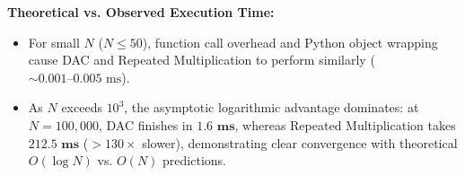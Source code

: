 \documentclass[12pt]{article}
\begin{document}
\textbf{Theoretical vs. Observed Execution Time:}
\begin{itemize}
    \item For small $N$ ($N \le 50$), function call overhead and Python object wrapping cause DAC and Repeated Multiplication to perform similarly ($\sim 0.001\text{--}0.005\text{ ms}$).
    \item As $N$ exceeds $10^3$, the asymptotic logarithmic advantage dominates: at $N = 100,000$, DAC finishes in $\mathbf{1.6\text{ ms}}$, whereas Repeated Multiplication takes $\mathbf{212.5\text{ ms}}$ ($>130\times$ slower), demonstrating clear convergence with theoretical $O(\log N)$ vs. $O(N)$ predictions.
\end{itemize}
\end{document}

